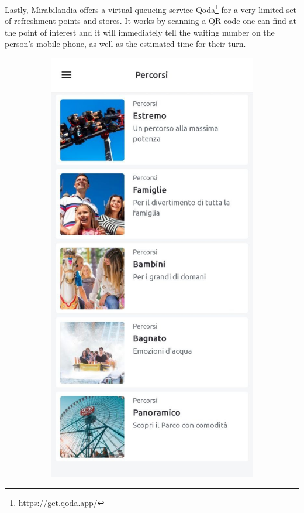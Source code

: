 Lastly, Mirabilandia offers a virtual queueing service Qoda\footnote{\url{https://get.qoda.app/}} for a very limited set of refreshment points
and stores.
It works by scanning a QR code one can find at the point of interest and it will immediately tell the waiting number on
the person's mobile phone, as well as the estimated time for their turn.

\begin{figure}[H]
	\centering
	\begin{subfigure}[b]{0.35\textwidth}
		\centering
		\includegraphics[width=\textwidth]{img/miraPlan}

\end{subfigure}
\end{figure}

